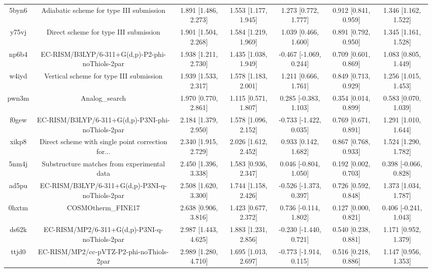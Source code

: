 \documentclass{article}
\begin{document}
\begin{center}
\begin{longtable}{|ccccccc|}
 5byn6 &           Adiabatic scheme for type III submission &  1.891 [1.486, 2.273] &  1.553 [1.177, 1.945] &     1.273 [0.772, 1.777] &  0.912 [0.841, 0.959] &   1.346 [1.162, 1.522] \\
 y75vj &              Direct scheme for type III submission &  1.901 [1.504, 2.268] &  1.584 [1.219, 1.969] &     1.039 [0.466, 1.600] &  0.891 [0.792, 0.950] &   1.345 [1.161, 1.528] \\
 np6b4 &    EC-RISM/B3LYP/6-311+G(d,p)-P2-phi-noThiols-2par &  1.938 [1.211, 2.730] &  1.435 [1.038, 1.949] &   -0.467 [-1.069, 0.244] &  0.709 [0.601, 0.869] &   1.083 [0.805, 1.449] \\
 w4iyd &            Vertical scheme for type III submission &  1.939 [1.533, 2.317] &  1.578 [1.183, 2.001] &     1.211 [0.666, 1.761] &  0.849 [0.713, 0.929] &   1.256 [1.015, 1.453] \\
 pwn3m &                                     Analog\_search &  1.970 [0.770, 2.861] &  1.115 [0.571, 1.807] &    0.285 [-0.383, 1.103] &  0.354 [0.014, 0.899] &   0.583 [0.070, 1.039] \\
 f0gew &  EC-RISM/B3LYP/6-311+G(d,p)-P3NI-phi-noThiols-2par &  2.184 [1.379, 2.950] &  1.578 [1.096, 2.152] &   -0.733 [-1.422, 0.035] &  0.769 [0.671, 0.891] &   1.291 [1.010, 1.644] \\
 xikp8 &  Direct scheme with single point correction for... &  2.340 [1.915, 2.729] &  2.026 [1.612, 2.452] &     0.933 [0.142, 1.682] &  0.867 [0.768, 0.933] &   1.524 [1.290, 1.782] \\
 5nm4j &        Substructure matches from experimental data &  2.450 [1.396, 3.338] &  1.583 [0.936, 2.347] &    0.046 [-0.804, 1.050] &  0.192 [0.002, 0.703] &  0.398 [-0.066, 0.828] \\
 ad5pu &    EC-RISM/B3LYP/6-311+G(d,p)-P3NI-q-noThiols-2par &  2.508 [1.620, 3.300] &  1.744 [1.158, 2.426] &   -0.526 [-1.373, 0.397] &  0.726 [0.592, 0.848] &   1.373 [1.034, 1.787] \\
 0hxtm &                                 COSMOtherm\_FINE17 &  2.638 [0.906, 3.816] &  1.423 [0.677, 2.372] &    0.736 [-0.114, 1.802] &  0.127 [0.000, 0.821] &  0.406 [-0.241, 1.043] \\
 ds62k &      EC-RISM/MP2/6-311+G(d,p)-P3NI-q-noThiols-2par &  2.987 [1.443, 4.625] &  1.883 [1.231, 2.856] &   -0.230 [-1.440, 0.721] &  0.540 [0.238, 0.881] &   1.171 [0.952, 1.379] \\
 ttjd0 &           EC-RISM/MP2/cc-pVTZ-P2-phi-noThiols-2par &  2.989 [1.280, 4.710] &  1.695 [1.013, 2.697] &   -0.773 [-1.914, 0.115] &  0.516 [0.218, 0.886] &   1.147 [0.956, 1.353] \\

\end{longtable}
\end{center}
\end{document}
